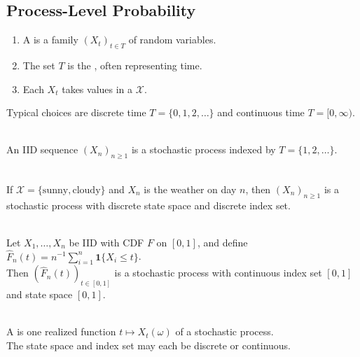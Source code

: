 \subsection{Process-Level Probability}

\begin{definition} \label{def:stochastic-process-state-index-space} 
\begin{enumerate}[label=(\roman*)]
\setlength{\itemsep}{0pt}
\item A  is a family $(X_t)_{t\in T}$ of random variables.
\item The set $T$ is the , often representing time.
\item Each $X_t$ takes values in a  $\mathcal{X}$.
\end{enumerate}
Typical choices are discrete time $T=\{0,1,2,\ldots\}$ and continuous time $T=[0,\infty)$.
\end{definition}

\begin{example} \label{ex:iid-sequence-as-stochastic-process} \\
An IID sequence $(X_n)_{n\geq1}$ is a stochastic process indexed by $T=\{1,2,\ldots\}$.
\end{example}

\begin{example} \label{ex:weather-process-state-index} \\
If $\mathcal{X}=\{\mathrm{sunny},\mathrm{cloudy}\}$ and $X_n$ is the weather on day $n$, then $(X_n)_{n\geq1}$ is a stochastic process with discrete state space and discrete index set.
\end{example}

\begin{example} \label{ex:empirical-cdf-as-stochastic-process} \\
Let $X_1,\ldots,X_n$ be IID with CDF $F$ on $[0,1]$, and define $\widehat{F}_n(t)=n^{-1}\sum\limits_{i=1}^{n}\mathbf{1}\{X_i\leq t\}$.\\
Then $(\widehat{F}_n(t))_{t\in[0,1]}$ is a stochastic process with continuous index set $[0,1]$ and state space $[0,1]$.
\end{example}

\begin{remark} \label{rem:sample-paths-and-process-types} \\
A  is one realized function $t\mapsto X_t(\omega)$ of a stochastic process.\\
The state space and index set may each be discrete or continuous.
\end{remark}

